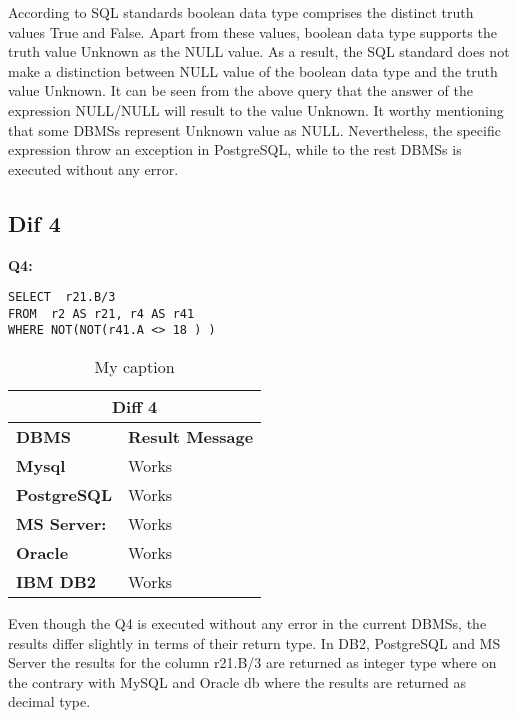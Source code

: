 According to SQL standards boolean data type comprises the distinct truth values True and False. Apart from these values, boolean data type supports the truth value Unknown as the NULL value. As a result, the SQL standard does not make a distinction between NULL value of the boolean data type and the truth value Unknown. It can be seen from the above query that the answer of  the expression NULL/NULL will result to the value Unknown. It worthy mentioning that some DBMSs represent Unknown value as NULL. Nevertheless, the specific expression throw an exception in PostgreSQL, while to the rest DBMSs is executed without any error. 

\subsection{Dif 4}
  
\begin{mdframed}[backgroundcolor=gray!20] 
\textbf{Q4:}
\begin{lstlisting}
SELECT  r21.B/3
FROM  r2 AS r21, r4 AS r41
WHERE NOT(NOT(r41.A <> 18 ) )  
\end{lstlisting}
\end{mdframed}

 
\begin{table}[h]
\centering
\caption{My caption}
\label{my-label}
\begin{tabular}{|p{2cm}|p{12cm}|}
\hline
\multicolumn{2}{|c|}{\textbf{Diff 4}}                                     \\ \hline
\textbf{DBMS}                              & \textbf{Result Message}      \\ \hline
{\color[HTML]{333333} \textbf{Mysql}}      & {\color[HTML]{333333} Works} \\ \hline
{\color[HTML]{333333} \textbf{PostgreSQL}} & {\color[HTML]{333333} Works} \\ \hline
{\color[HTML]{333333} \textbf{MS Server:}} & {\color[HTML]{333333} Works} \\ \hline
\textbf{Oracle}                            & Works                        \\ \hline
\textbf{IBM DB2}                           & Works                        \\ \hline
\end{tabular}
\end{table}

Even though the Q4 is executed without any error in the current DBMSs, the results differ slightly in terms of their return type. In DB2, PostgreSQL and MS Server the results for the column  r21.B/3  are returned as integer type where on the contrary with MySQL and Oracle db where the results are returned as decimal type. 

